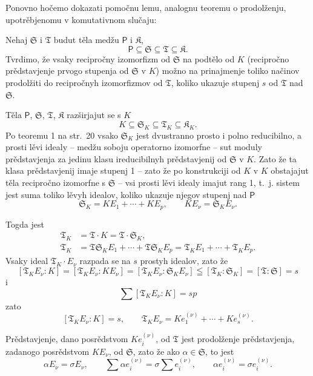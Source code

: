 \documentclass[11pt]{article}
\begin{document}
Ponovno hočemo dokazati pomočnu lemu, analognu teoremu o prodolženju, upotrěbjenomu v komutativnom slučaju:

Nehaj \(\mathfrak S\) i \(\mathfrak T\) budut těla medžu \(\mathsf P\) i \(\mathfrak K\),
\[
\mathsf P \subseteq \mathfrak S \subseteq \mathfrak T \subseteq \mathfrak K.
\]
Tvrdimo, že vsaky recipročny izomorfizm od \(\mathfrak S\) na podtělo od \(K\) (recipročno prědstavjenje prvogo stupenja od \(\mathfrak S\) v \(K\)) možno na prinajmenje toliko načinov prodolžiti do recipročnyh izomorfizmov od \(\mathfrak T\), koliko ukazuje stupenj \(s\) od \(\mathfrak T\) nad \(\mathfrak S\).

Těla \(\mathsf P\), \(\mathfrak S\), \(\mathfrak T\), \(\mathfrak K\) razširjajut se s \(K\)
\[
K\subseteq \mathfrak S_K\subseteq \mathfrak T_K\subseteq \mathfrak K_K.
\]
Po teoremu 1 na str.~20 vsako \(\mathfrak S_K\) jest dvustranno prosto i polno reducibilno, a prosti lěvi idealy -- medžu soboju operatorno izomorfne -- sut moduly prědstavjenja za jedinu klasu ireducibilnyh prědstavjenij od \(\mathfrak S\) v \(K\). Zato že ta klasa prědstavjenij imaje stupenj 1 -- zato že po konstrukciji od \(K\) v \(K\) obstajajut těla recipročno izomorfne s \(\mathfrak S\) -- vsi prosti lěvi idealy imajut rang 1, t.~j. sistem jest suma toliko lěvyh idealov, koliko ukazuje njegov stupenj nad \(\mathsf P\)
\[
\mathfrak S_K=K E_1+\cdots+K E_p,\qquad K E_\nu=\mathfrak S_K E_\nu.
\]

Togda jest
\[
\begin{aligned}
\mathfrak T_K&=\mathfrak T\cdot K=\mathfrak T\cdot \mathfrak S_K,\\
\mathfrak T_K&=\mathfrak T\mathfrak S_K E_1+\cdots+\mathfrak T\mathfrak S_K E_p
              =\mathfrak T_K E_1+\cdots+\mathfrak T_K E_p.
\end{aligned}
\]
Vsaky ideal \(\mathfrak T_K\cdot E_\nu\) razpada se na \(s\) prostyh idealov, zato že
\[
[\mathfrak T_K E_\nu:K]=[\mathfrak T_K E_\nu:K E_\nu]=[\mathfrak T_K E_\nu:\mathfrak S_K E_\nu]\leqq[\mathfrak T_K:\mathfrak S_K]=[\mathfrak T:\mathfrak S]=s
\]
i
\[
\sum [\mathfrak T_K E_\nu:K]=sp
\]
zato
\[
[\mathfrak T_K E_\nu:K]=s,
\qquad
\mathfrak T_K E_\nu=K e_1^{(\nu)}+\cdots+K e_s^{(\nu)}.
\]

Prědstavjenje, dano posrědstvom \(K e_i^{(\nu)}\), od \(\mathfrak T\) jest prodolženje prědstavjenja, zadanogo posrědstvom \(K E_\nu\), od \(\mathfrak S\), zato že ako \(\alpha\in \mathfrak S\), to jest
\[
\alpha E_\nu=\sigma E_\nu,\qquad
\sum \alpha e_i^{(\nu)}=\sigma\sum e_i^{(\nu)},\qquad
\alpha e_i^{(\nu)}=\sigma e_i^{(\nu)}.
\]
\end{document}
